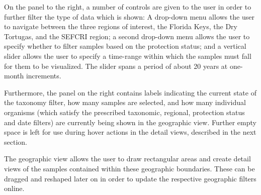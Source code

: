 \documentclass[letterpaper]{article} %
\begin{document}
On the panel to the right, a number of controls are given to the user in order
to further filter the type of data which is shown: A drop-down menu allows the
user to navigate between the three regions of interest, the Florida Keys, the
Dry Tortugas, and the SEFCRI region; a second drop-down menu allows the user to
specify whether to filter samples based on the protection status; and
a vertical slider allows the user to specify a time-range within which the
samples must fall for them to be visualized.  The slider spans a period of
about 20 years at one-month increments.

Furthermore, the panel on the right contains labels indicating the current
state of the taxonomy filter,  how many samples are selected, and how many
individual organisms (which satisfy the prescribed taxonomic, regional,
protection status and date filters) are currently being shown in the geographic
view.  Further empty space is left for use during hover actions in the detail
views, described in the next section.

The geographic view allows the user to draw rectangular areas and create
detail views of the samples contained within these geographic boundaries.
These can be dragged and reshaped later on in order to update the respective
geographic filters online.
\end{document}
